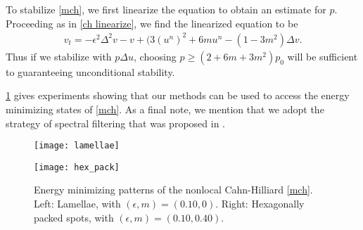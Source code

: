 To stabilize \cref{mch}, we first linearize the equation to obtain an estimate for $p$. Proceeding as in \cref{ch linearize}, we find the linearized equation to be
\begin{align}
v_t = -\epsilon^2\Delta^2 v - v + (3(u^n)^2 + 6mu^n - (1-3m^2) \Delta v.
\end{align}
Thus if we stabilize with $p\Delta u$, choosing $p \geq (2+6m+3m^2)p_0$ will be sufficient to guaranteeing unconditional stability.

\cref{fig:mchp energy minimizers} gives experiments showing that our methods can be used to access the energy minimizing states of \cref{mch}. As a final note, we mention that we adopt the strategy of spectral filtering that was proposed in \cite{choksi20112d}.

\begin{figure}[htb!]
        \centering
\begin{minipage}{0.46\textwidth}
       \texttt{[image: lamellae]}
\end{minipage}
\begin{minipage}{0.46\textwidth}
\centering
       \texttt{[image: hex\_pack]}
\end{minipage}
\caption[{Energy minimizing patterns of the nonlocal Cahn-Hilliard}]{Energy minimizing patterns of the nonlocal Cahn-Hilliard \cref{mch}. Left: Lamellae, with $(\epsilon,m)=(0.10,0)$. Right: Hexagonally packed spots, with $(\epsilon,m)=(0.10,0.40)$.}
\label{fig:mchp energy minimizers}
\end{figure}
